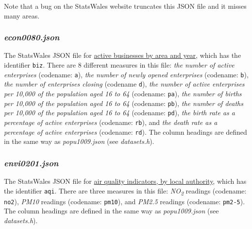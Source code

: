 \documentclass[a4paper]{article}
\begin{document}
Note that a bug on the StatsWales website truncates this JSON file and it misses many areas.


\subsubsection*{\emph{econ0080.json}}\label{sec:cwk datasets econ0080}
The StatsWales JSON file for \href{https://statswales.gov.wales/Catalogue/Business-Economy-and-Labour-Market/Businesses/Business-Demography/activebusinessenterprises-by-area-year}{active businesses by area and year}, which has the identifier \texttt{biz}. There are 8 different measures in this file: \emph{the number of active enterprises} (codename: \texttt{a}), \emph{the number of newly opened enterprises} (codename: \texttt{b}), \emph{the number of enterprises closing} (codename \texttt{d}), \emph{the number of active enterprises per 10,000 of the population aged 16 to 64} (codename: \texttt{pa}), \emph{the number of births per 10,000 of the population aged 16 to 64} (codename: \texttt{pb}), \emph{the number of deaths per 10,000 of the population aged 16 to 64} (codename: \texttt{pd}), \emph{the birth rate as a percentage of active enterprises} (codename: \texttt{rb}), and \emph{the death rate as a percentage of active enterprises} (codename: \texttt{rd}). The column headings are defined in the same way as \emph{popu1009.json} (see \emph{datasets.h}).


\subsubsection*{\emph{envi0201.json}}\label{sec:cwk datasets envi0201}
The StatsWales JSON file for \href{https://statswales.gov.wales/Catalogue/Environment-and-Countryside/Air-Quality/airqualityindicators-by-localauthority}{air quality indicators, by local authority}, which has the identifier \texttt{aqi}. There are three measures in this file: \emph{NO\textsubscript{2}} readings (codename: \texttt{no2}), \emph{PM10} readings (codename: \texttt{pm10}), and \emph{PM2.5} readings (codename: \texttt{pm2-5}). The column headings are defined in the same way as \emph{popu1009.json} (see \emph{datasets.h}). %

\end{document}
